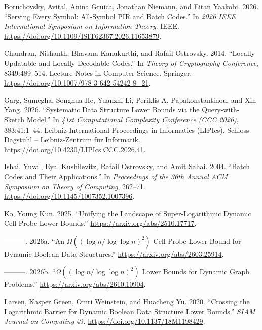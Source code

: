 \documentclass[
]{article}
\newlength{\cslhangindent}
\newlength{\cslentryspacingunit} %
\newenvironment{CSLReferences}[2] %
 {%
  \setlength{\parindent}{0pt}
  \ifodd #1
  \let\oldpar\par
  \def\par{\hangindent=\cslhangindent\oldpar}
  \fi
  \setlength{\parskip}{#2\cslentryspacingunit}
 }%
 {}
\begin{document}
\hypertarget{refs}{}
\begin{CSLReferences}{1}{0}
\leavevmode{}%
Boruchovsky, Avital, Anina Gruica, Jonathan Niemann, and Eitan Yaakobi.
2026. {``Serving Every Symbol: All-Symbol PIR and Batch Codes.''} In
\emph{2026 IEEE International Symposium on Information Theory}. IEEE.
\url{https://doi.org/10.1109/ISIT62367.2026.11653879}.

\leavevmode{}%
Chandran, Nishanth, Bhavana Kanukurthi, and Rafail Ostrovsky. 2014.
{``Locally Updatable and Locally Decodable Codes.''} In \emph{Theory of
Cryptography Conference}, 8349:489--514. Lecture Notes in Computer
Science. Springer. \url{https://doi.org/10.1007/978-3-642-54242-8_21}.

\leavevmode{}%
Garg, Sumegha, Songhua He, Yuanzhi Li, Periklis A. Papakonstantinou, and
Xin Yang. 2026. {``Systematic Data Structure Lower Bounds via the
Query-with-Sketch Model.''} In \emph{41st Computational Complexity
Conference (CCC 2026)}, 383:41:1--44. Leibniz International Proceedings
in Informatics (LIPIcs). Schloss Dagstuhl -- Leibniz-Zentrum f{ü}r
Informatik. \url{https://doi.org/10.4230/LIPIcs.CCC.2026.41}.

\leavevmode{}%
Ishai, Yuval, Eyal Kushilevitz, Rafail Ostrovsky, and Amit Sahai. 2004.
{``Batch Codes and Their Applications.''} In \emph{Proceedings of the
36th Annual ACM Symposium on Theory of Computing}, 262--71.
\url{https://doi.org/10.1145/1007352.1007396}.

\leavevmode{}%
Ko, Young Kun. 2025. {``Unifying the Landscape of Super-Logarithmic
Dynamic Cell-Probe Lower Bounds.''}
\url{https://arxiv.org/abs/2510.17717}.

\leavevmode{}%
---------. 2026a. {``An \(\Omega((\log n/\log\log n)^2)\) Cell-Probe
Lower Bound for Dynamic Boolean Data Structures.''}
\url{https://arxiv.org/abs/2603.25914}.

\leavevmode{}%
---------. 2026b. {``\(\Omega((\log n/\log\log n)^2)\) Lower Bounds for
Dynamic Graph Problems.''} \url{https://arxiv.org/abs/2610.10904}.

\leavevmode{}%
Larsen, Kasper Green, Omri Weinstein, and Huacheng Yu. 2020. {``Crossing
the Logarithmic Barrier for Dynamic Boolean Data Structure Lower
Bounds.''} \emph{SIAM Journal on Computing} 49.
\url{https://doi.org/10.1137/18M1198429}.


\end{CSLReferences}
\end{document}
